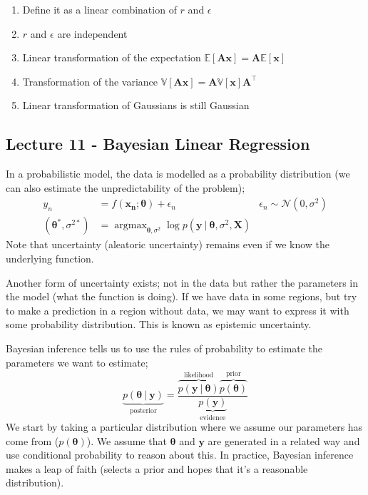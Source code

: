 \documentclass[a4paper, 12pt]{article}
\newcommand{\mat}[1]{\boldsymbol{#1}}
\renewcommand{\vec}[1]{\boldsymbol{#1}}
\DeclareMathOperator*{\argmax}{argmax}
\begin{document}
                \begin{enumerate}[(1)]
                    \itemsep0em
                    \setcounter{enumi}{4}
                    \item Define it as a linear combination of $r$ and $\epsilon$
                    \item $r$ and $\epsilon$ are independent
                    \item Linear transformation of the expectation $\mathbb{E}[\mat{A}\vec{x}] = \mat{A}\mathbb{E}[\vec{x}]$
                    \setcounter{enumi}{8}
                    \item Transformation of the variance $\mathbb{V}[\mat{A}\vec{x}] = \mat{A}\mathbb{V}[\vec{x}]\mat{A}^\top$
                    \setcounter{enumi}{10}
                    \item Linear transformation of Gaussians is still Gaussian
                \end{enumerate}
        \subsection*{Lecture 11 - Bayesian Linear Regression}
            In a probabilistic model, the data is modelled as a probability distribution (we can also estimate the unpredictability of the problem);
            \begin{align*}
                y_n & = f(\vec{x_n}; \vec{\theta}) + \epsilon_n & \epsilon_n \sim \mathcal{N}(0, \sigma^2) \\
                (\vec{\theta^*}, \sigma^{2*}) & = \argmax_{\vec{\theta}, \sigma^2} \log p(\vec{y}\ |\ \vec{\theta}, \sigma^2, \mat{X})
            \end{align*}
            Note that uncertainty (aleatoric uncertainty) remains even if we know the underlying function.
            \medskip

            Another form of uncertainty exists; not in the data but rather the parameters in the model (what the function is doing).
            If we have data in some regions, but try to make a prediction in a region without data, we may want to express it with some probability distribution.
            This is known as epistemic uncertainty.
            \medskip

            Bayesian inference tells us to use the rules of probability to estimate the parameters we want to estimate;
            $$\underbrace{p(\vec{\theta}\ |\ \vec{y})}_\text{posterior} = \frac{\overbrace{p(\vec{y}\ |\ \vec{\theta})}^\text{likelihood}\overbrace{p(\vec{\theta})}^\text{prior}}{\underbrace{p(\vec{y})}_\text{evidence}}$$
            We start by taking a particular distribution where we assume our parameters has come from ($p(\vec{\theta})$).
            We assume that $\vec{\theta}$ and $\vec{y}$ are generated in a related way and use conditional probability to reason about this.
            In practice, Bayesian inference makes a leap of faith (selects a prior and hopes that it's a reasonable distribution).
            \medskip
\end{document}
